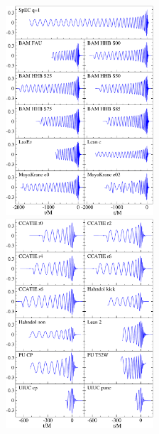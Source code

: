 
\begin{figure}
\includegraphics[width=0.49\textwidth]{figures/ninja1/Prune_Re_h22-A}
$\;$
\includegraphics[width=0.49\textwidth]{figures/ninja1/Prune_Re_h22-B}\\[-.25em]


\end{figure}
